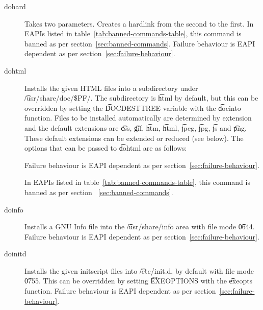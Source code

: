 \begin{description}
\item[dohard] Takes two parameters. Creates a hardlink from the second to the first. In EAPIs
    listed in table~\ref{tab:banned-commands-table}, this command is banned as per
    section~\ref{sec:banned-commands}. Failure behaviour is EAPI dependent as per
    section~\ref{sec:failure-behaviour}.

\item[dohtml] Installs the given HTML files into a subdirectory under \t{/usr/share/doc/\$PF/}.
The subdirectory is \t{html} by default, but this can be overridden by setting the \t{DOCDESTTREE}
variable with the \t{docinto} function. Files to be installed automatically are determined by
extension and the default extensions are \t{css}, \t{gif}, \t{htm}, \t{html}, \t{jpeg}, \t{jpg},
\t{js} and \t{png}. These default extensions can be extended or reduced (see below). The options
that can be passed to \t{dohtml} are as follows:

    Failure behaviour is EAPI dependent as per section~\ref{sec:failure-behaviour}.

\IFKDEBUILDELSE
{
    In EAPIs listed in table~\ref{tab:banned-commands-table}, this command is banned as
    per section ~\ref{sec:banned-commands}.
}{
}

\item[doinfo] Installs a GNU Info file into the \t{/usr/share/info} area with file mode \t{0644}.
    Failure behaviour is EAPI dependent as per section~\ref{sec:failure-behaviour}.

\item[doinitd] Installs the given initscript files into \t{/etc/init.d}, by default with file mode
    \t{0755}. This can be overridden by setting \t{EXEOPTIONS} with the \t{exeopts} function.
    Failure behaviour is EAPI dependent as per section~\ref{sec:failure-behaviour}.


\end{description}
